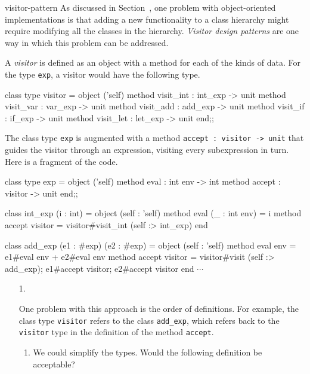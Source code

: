 \begin{exercise}{visitor-pattern}
As discussed in
Section~, one problem
with object-oriented implementations is that adding a new functionality
to a class hierarchy might require modifying all the classes
in the hierarchy.  \emph{Visitor design patterns} are one way in
which this problem can be addressed.

A \emph{visitor} is defined as an object with a method for each of the
kinds of data.  For the type \hbox{\lstinline$exp$}, a visitor would have the
following type.

\begin{ocaml}
class type visitor =
  object ('self)
    method visit_int : int_exp -> unit
    method visit_var : var_exp -> unit
    method visit_add : add_exp -> unit
    method visit_if  : if_exp  -> unit
    method visit_let : let_exp -> unit
  end;;
\end{ocaml}
%
The class type \hbox{\lstinline$exp$} is augmented with a
method \hbox{\lstinline$accept : visitor -> unit$} that guides the
visitor through an expression, visiting every subexpression in turn.
Here is a fragment of the code.

\begin{ocaml}
class type exp =
  object ('self)
    method eval : int env -> int
    method accept : visitor -> unit
  end;;

class int_exp (i : int) =
  object (self : 'self)
    method eval (_ : int env) = i
    method accept visitor = visitor#visit_int (self :> int_exp)
  end

class add_exp (e1 : #exp) (e2 : #exp) =
  object (self : 'self)
    method eval env = e1#eval env + e2#eval env
    method accept visitor =
      visitor#visit (self :> add_exp);
      e1#accept visitor;
      e2#accept visitor
  end
$\cdots$
\end{ocaml}

\begin{enumerate}
\item[1.]

One problem with this approach is the order of definitions.  For
example, the class type \hbox{\lstinline$visitor$} refers to the
class \hbox{\lstinline$add_exp$}, which refers back to
the \hbox{\lstinline$visitor$} type in the definition of the
method \hbox{\lstinline$accept$}.

\begin{enumerate}
\item We could simplify the types.  Would the following definition be acceptable?


\end{enumerate}
\end{enumerate}
\end{exercise}
